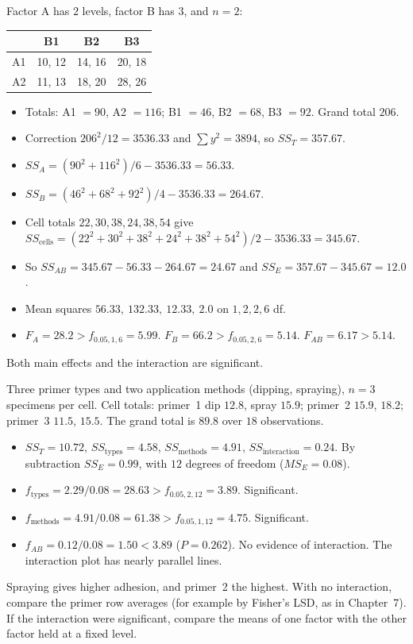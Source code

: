 \begin{example}\label{ex:two-factor}
Factor A has $2$ levels, factor B has $3$, and $n=2$:
\begin{center}
\begin{tabular}{lccc}
\toprule
 & B1 & B2 & B3\\
\midrule
A1 & 10, 12 & 14, 16 & 20, 18\\
A2 & 11, 13 & 18, 20 & 28, 26\\
\bottomrule
\end{tabular}
\end{center}
\begin{itemize}
  \item Totals: A1 $=90$, A2 $=116$; B1 $=46$, B2 $=68$, B3 $=92$. Grand total $206$.
  \item Correction $206^2/12=3536.33$ and $\sum y^2=3894$, so $SS_T=357.67$.
  \item $SS_A=(90^2+116^2)/6-3536.33=56.33$.
  \item $SS_B=(46^2+68^2+92^2)/4-3536.33=264.67$.
  \item Cell totals $22,30,38,24,38,54$ give $SS_{\mathrm{cells}}=(22^2+30^2+38^2+24^2+38^2+54^2)/2-3536.33=345.67$.
  \item So $SS_{AB}=345.67-56.33-264.67=24.67$ and $SS_E=357.67-345.67=12.0$.
  \item Mean squares $56.33,\ 132.33,\ 12.33,\ 2.0$ on $1,2,2,6$ df.
  \item $F_A=28.2>f_{0.05,1,6}=5.99$. $F_B=66.2>f_{0.05,2,6}=5.14$. $F_{AB}=6.17>5.14$.
\end{itemize}
Both main effects and the interaction are significant.
\end{example}

\begin{example}\label{ex:primer}
Three primer types and two application methods (dipping, spraying), $n=3$ specimens per cell. Cell totals: primer~1 dip $12.8$, spray $15.9$; primer~2 $15.9$, $18.2$; primer~3 $11.5$, $15.5$. The grand total is $89.8$ over $18$ observations.
\begin{itemize}
  \item $SS_T=10.72$, $SS_{\text{types}}=4.58$, $SS_{\text{methods}}=4.91$, $SS_{\text{interaction}}=0.24$. By subtraction $SS_E=0.99$, with $12$ degrees of freedom ($MS_E=0.08$).
  \item $f_{\text{types}}=2.29/0.08=28.63>f_{0.05,2,12}=3.89$. Significant.
  \item $f_{\text{methods}}=4.91/0.08=61.38>f_{0.05,1,12}=4.75$. Significant.
  \item $f_{AB}=0.12/0.08=1.50<3.89$ ($P=0.262$). No evidence of interaction. The interaction plot has nearly parallel lines.
\end{itemize}
Spraying gives higher adhesion, and primer~2 the highest. With no interaction, compare the primer row averages (for example by Fisher's LSD, as in Chapter~7). If the interaction were significant, compare the means of one factor with the other factor held at a fixed level.
\end{example}

